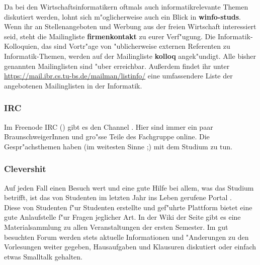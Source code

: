 Da bei den Wirtschaftsinformatikern oftmals auch
informatikrelevante Themen diskutiert werden, lohnt sich m"oglicherweise auch
ein Blick in \textbf{winfo-studs}. Wenn ihr an Stellenangeboten und Werbung aus
der freien Wirtschaft interessiert seid, steht die Mailingliste
\textbf{firmenkontakt} zu eurer Verf"ugung. Die Informatik-Kolloquien, das sind
Vortr"age von "ublicherweise externen Referenten zu Informatik-Themen, werden
auf der Mailingliste \textbf{kolloq} angek"undigt. Alle bisher genannten
Mailinglisten sind "uber 
erreichbar. Außerdem findet ihr unter \url{https://mail.ibr.cs.tu-bs.de/mailman/listinfo/} eine umfassendere Liste der angebotenen Mailinglisten in der Informatik.






\subsubsection*{IRC}

Im Freenode IRC () gibt es den Channel . Hier
sind immer ein paar BraunschweigerInnen und gro"sse Teile des Fachgruppe online. Die Gespr"achsthemen haben (im weitesten
Sinne ;) mit dem Studium zu tun.

\subsubsection*{Clevershit}

Auf jeden Fall einen Besuch wert und eine gute Hilfe bei allem, was das Studium betrifft, ist das von Studenten im letzten Jahr ins Leben gerufene Portal \mbox{}.\\
Diese von Studenten f"ur Studenten erstellte und gef"uhrte Plattform bietet eine gute Anlaufstelle f"ur Fragen jeglicher Art. In der Wiki der Seite gibt es eine Materialsammlung zu allen Veranstaltungen der ersten Semester. Im gut besuchten Forum werden stets aktuelle Informationen und "Anderungen zu den Vorlesungen weiter gegeben, Hausaufgaben und Klausuren diskutiert oder einfach etwas Smalltalk gehalten.

